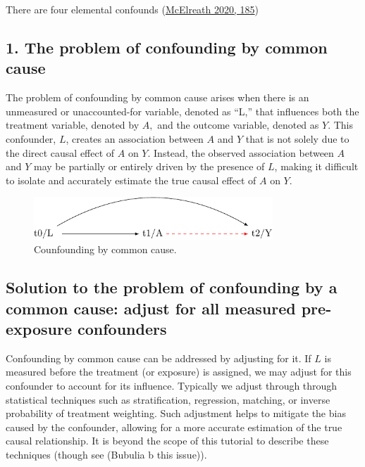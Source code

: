 \documentclass[
  singlecolumn]{report}
\begin{document}
There are four elemental confounds
(\protect\hyperlink{ref-mcelreath2020}{McElreath 2020, 185})

\hypertarget{the-problem-of-confounding-by-common-cause}{%
\subsection{1. The problem of confounding by common
cause}\label{the-problem-of-confounding-by-common-cause}}

The problem of confounding by common cause arises when there is an
unmeasured or unaccounted-for variable, denoted as ``L,'' that
influences both the treatment variable, denoted by \(A,\) and the
outcome variable, denoted as \(Y.\) This confounder, \(L\), creates an
association between \(A\) and \(Y\) that is not solely due to the direct
causal effect of \(A\) on \(Y\). Instead, the observed association
between \(A\) and \(Y\) may be partially or entirely driven by the
presence of \(L\), making it difficult to isolate and accurately
estimate the true causal effect of \(A\) on \(Y\).

\begin{figure}

{\centering \includegraphics[width=0.8\textwidth,height=\textheight]{causal-dags_files/figure-pdf/fig-dag-common-cause-1.pdf}

}

\caption{\label{fig-dag-common-cause}Counfounding by common cause.}

\end{figure}

\hypertarget{solution-to-the-problem-of-confounding-by-a-common-cause-adjust-for-all-measured-pre-exposure-confounders}{%
\subsection{Solution to the problem of confounding by a common cause:
adjust for all measured pre-exposure
confounders}\label{solution-to-the-problem-of-confounding-by-a-common-cause-adjust-for-all-measured-pre-exposure-confounders}}

Confounding by common cause can be addressed by adjusting for it. If
\(L\) is measured before the treatment (or exposure) is assigned, we may
adjust for this confounder to account for its influence. Typically we
adjust through through statistical techniques such as stratification,
regression, matching, or inverse probability of treatment weighting.
Such adjustment helps to mitigate the bias caused by the confounder,
allowing for a more accurate estimation of the true causal relationship.
It is beyond the scope of this tutorial to describe these techniques
(though see (Bubulia b this issue)).
\end{document}
